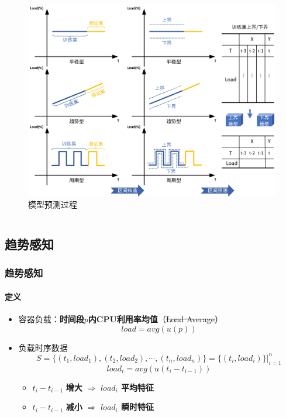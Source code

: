 \begin{frame}
\begin{columns}
\begin{column}{0.6\textwidth}
\begin{figure}[htb]
\centering
\includegraphics[scale=0.38]{figures/fig7_predict_process.jpg}
\caption{模型预测过程}
\label{fig:fig7}
\end{figure}
\end{column}
\end{columns}
\end{frame}

\subsection{趋势感知}

\begin{frame}
\frametitle{趋势感知}
\framesubtitle{定义}
\begin{itemize}
    \item 容器负载：\textbf{时间段$p$内CPU利用率均值}（\sout{Load Average}）
    \begin{equation}
        load = avg(u(p))
    \end{equation}
    \item 负载时序数据
    \begin{equation}
        S=\{(t_1,load_1),(t_2,load_2),\cdots,(t_n,load_n)\}=\{(t_i,load_i)\}|^n_{i=1}
    \end{equation}
    \begin{equation}
        load_i = avg(u(t_i - t_{i-1}))
    \end{equation}
    \begin{itemize}
        \item $t_i - t_{i-1}$ \textbf{增大} $\Rightarrow$ \textbf{$load_i$ 平均特征}
        \item $t_i - t_{i-1}$ \textbf{减小} $\Rightarrow$ \textbf{$load_i$ 瞬时特征}
    \end{itemize}
\end{itemize}
\end{frame}

